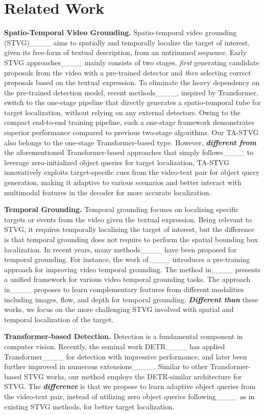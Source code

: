\section{Related Work}
\textbf{Spatio-Temporal Video Grounding.} Spatio-temporal video grounding (STVG)____ aims to spatially and temporally localize the target of interest, given its free-form of textual description, from an untrimmed sequence. Early STVG approaches____ mainly consists of two stages, \emph{first} generating candidate proposals from the video with a pre-trained detector and \emph{then} selecting correct proposals based on the textual expression. To eliminate the heavy dependency on the pre-trained detection model, recent methods____, inspired by Transformer, switch to the one-stage pipeline that directly generates a spatio-temporal tube for target localization, without relying on any external detectors. Owing to the compact end-to-end training pipeline, such a one-stage framework demonstrates superior performance compared to previous two-stage algorithms. Our TA-STVG also belongs to the one-stage Transformer-based type. However, \emph{\textbf{different from}} the aforementioned Transformer-based approaches that simply follows____ to leverage zero-initialized object queries for target localization, TA-STVG innovatively exploits target-specific cues from the video-text pair for object query generation, making it adaptive to various scenarios and better interact with multimodal features in the decoder for more accurate localization. 


\textbf{Temporal Grounding.} Temporal grounding focuses on localizing specific targets or events from the video given the textual expression. Being relevant to STVG, it requires temporally localizing the target of interest, but the difference is that temporal grounding does not require to perform the spatial bounding box localization.
In recent years, many methods____ have been proposed for temporal grounding. For instance, the work of____ introduces a pre-training approach for improving video temporal grounding. The method in____ presents a unified framework for various video temporal grounding tasks. The approach in____ proposes to learn complementary features from different modalities including images, flow, and depth for temporal grounding. \textbf{\emph{Different than}} these works, we focus on the more challenging STVG involved with spatial and temporal localization of the target.

\textbf{Transformer-based Detection.} Detection is a fundamental component in computer vision. Recently, the seminal work DETR____ has applied Transformer____ for detection with impressive performance, and later been further improved in numerous extensions____. Similar to other Transformer-based STVG works, our method employs the DETR-similar architecture for STVG. The \emph{\textbf{difference}} is that we propose to learn adaptive object queries from the video-text pair, instead of utilizing zero object queries following____  as in existing STVG methods, for better target localization. 

